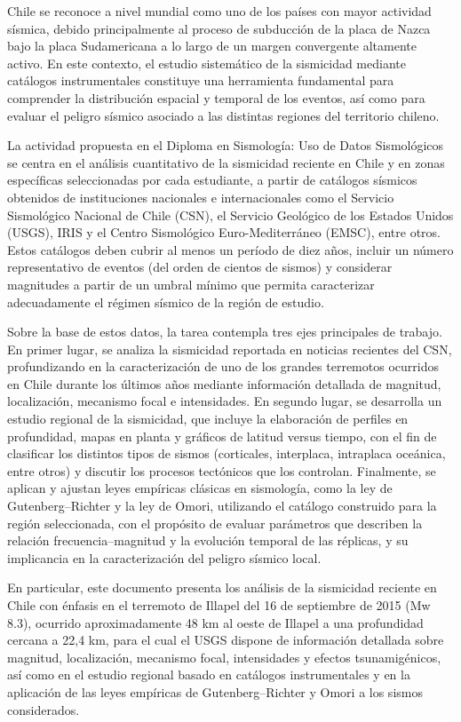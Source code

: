 \documentclass[a4paper,12pt]{article} %
\numberwithin{equation}{section} %
\numberwithin{figure}{section} %
\begin{document}
Chile se reconoce a nivel mundial como uno de los países con mayor actividad sísmica, debido principalmente al proceso de subducción de la placa de Nazca bajo la placa Sudamericana a lo largo de un margen convergente altamente activo. En este contexto, el estudio sistemático de la sismicidad mediante catálogos instrumentales constituye una herramienta fundamental para comprender la distribución espacial y temporal de los eventos, así como para evaluar el peligro sísmico asociado a las distintas regiones del territorio chileno.

La actividad propuesta en el Diploma en Sismología: Uso de Datos Sismológicos se centra en el análisis cuantitativo de la sismicidad reciente en Chile y en zonas específicas seleccionadas por cada estudiante, a partir de catálogos sísmicos obtenidos de instituciones nacionales e internacionales como el Servicio Sismológico Nacional de Chile (CSN), el Servicio Geológico de los Estados Unidos (USGS), IRIS y el Centro Sismológico Euro-Mediterráneo (EMSC), entre otros. Estos catálogos deben cubrir al menos un período de diez años, incluir un número representativo de eventos (del orden de cientos de sismos) y considerar magnitudes a partir de un umbral mínimo que permita caracterizar adecuadamente el régimen sísmico de la región de estudio.

Sobre la base de estos datos, la tarea contempla tres ejes principales de trabajo. En primer lugar, se analiza la sismicidad reportada en noticias recientes del CSN, profundizando en la caracterización de uno de los grandes terremotos ocurridos en Chile durante los últimos años mediante información detallada de magnitud, localización, mecanismo focal e intensidades. En segundo lugar, se desarrolla un estudio regional de la sismicidad, que incluye la elaboración de perfiles en profundidad, mapas en planta y gráficos de latitud versus tiempo, con el fin de clasificar los distintos tipos de sismos (corticales, interplaca, intraplaca oceánica, entre otros) y discutir los procesos tectónicos que los controlan. Finalmente, se aplican y ajustan leyes empíricas clásicas en sismología, como la ley de Gutenberg--Richter y la ley de Omori, utilizando el catálogo construido para la región seleccionada, con el propósito de evaluar parámetros que describen la relación frecuencia--magnitud y la evolución temporal de las réplicas, y su implicancia en la caracterización del peligro sísmico local.

En particular, este documento presenta los análisis de la sismicidad reciente en Chile con énfasis en el terremoto de Illapel del 16 de septiembre de 2015 (Mw 8.3), ocurrido aproximadamente 48 km al oeste de Illapel a una profundidad cercana a 22,4 km, para el cual el USGS dispone de información detallada sobre magnitud, localización, mecanismo focal, intensidades y efectos tsunamigénicos, así como en el estudio regional basado en catálogos instrumentales y en la aplicación de las leyes empíricas de Gutenberg--Richter y Omori a los sismos considerados.
\end{document}
